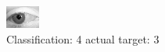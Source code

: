 \begin{figure}[h!]
\begin{center}
\includegraphics[width=0.60\columnwidth]{figures/ID2861_class_4_target_3.png}
\end{center}
\caption{ Classification: 4 actual target: 3}
\label{fig:ID2861_class_4_target_3}
\end{figure}
